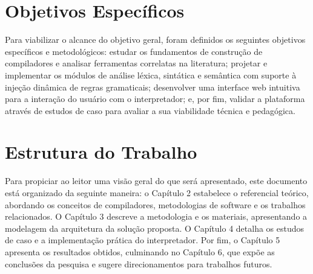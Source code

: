 \section{Objetivos Específicos}

Para viabilizar o alcance do objetivo geral, foram definidos os seguintes objetivos específicos e metodológicos: estudar os fundamentos de construção de compiladores e analisar ferramentas correlatas na literatura; projetar e implementar os módulos de análise léxica, sintática e semântica com suporte à injeção dinâmica de regras gramaticais; desenvolver uma interface web intuitiva para a interação do usuário com o interpretador; e, por fim, validar a plataforma através de estudos de caso para avaliar a sua viabilidade técnica e pedagógica.

\section{Estrutura do Trabalho}

Para propiciar ao leitor uma visão geral do que será apresentado, este documento está organizado da seguinte maneira: o Capítulo 2 estabelece o referencial teórico, abordando os conceitos de compiladores, metodologias de software e os trabalhos relacionados. O Capítulo 3 descreve a metodologia e os materiais, apresentando a modelagem da arquitetura da solução proposta. O Capítulo 4 detalha os estudos de caso e a implementação prática do interpretador. Por fim, o Capítulo 5 apresenta os resultados obtidos, culminando no Capítulo 6, que expõe as conclusões da pesquisa e sugere direcionamentos para trabalhos futuros.
